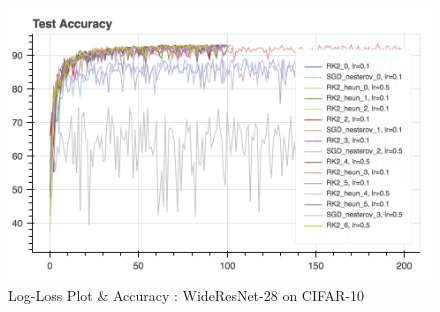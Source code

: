 \begin{figure}[htb]
\includegraphics[scale=0.5]{plots/wide_resnet28_3.png}
\caption{Log-Loss Plot \& Accuracy : WideResNet-28 on CIFAR-10}
\end{figure}






